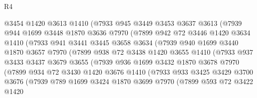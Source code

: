 \begin{lexlean}{R4}
\begin{coremodule}
              @3454
              @1420
              @3613
              @1410
              (@7933
                @945
                @3449
                @3453
                @3637
                @3613
                (@7939
                  @944
                  @1699
                  @3448
                  @1870
                  @3636
                  @7970
                  (@7899
                    @942
                    @72
                    @3446
                    @1420
                    @3634
                    @1410
                    (@7933
                      @941
                      @3441
                      @3445
                      @3658
                      @3634
                      (@7939
                        @940
                        @1699
                        @3440
                        @1870
                        @3657
                        @7970
                        (@7899
                          @938
                          @72
                          @3438
                          @1420
                          @3655
                          @1410
                          (@7933
                            @937
                            @3433
                            @3437
                            @3679
                            @3655
                            (@7939
                              @936
                              @1699
                              @3432
                              @1870
                              @3678
                              @7970
                              (@7899
                                @934
                                @72
                                @3430
                                @1420
                                @3676
                                @1410
                                (@7933
                                  @933
                                  @3425
                                  @3429
                                  @3700
                                  @3676
                                  (@7939
                                    @789
                                    @1699
                                    @3424
                                    @1870
                                    @3699
                                    @7970
                                    (@7899
                                      @593
                                      @72
                                      @3422
                                      @1420

\end{coremodule}
\end{lexlean}
